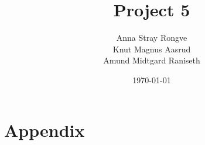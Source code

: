 \documentclass{article}
\title{Project 5}
\author{Anna Stray Rongve \\ Knut Magnus Aasrud \\ Amund Midtgard Raniseth}
\date{\today}
\begin{document}
\maketitle













\section{Appendix}

\printbibliography
\end{document}
